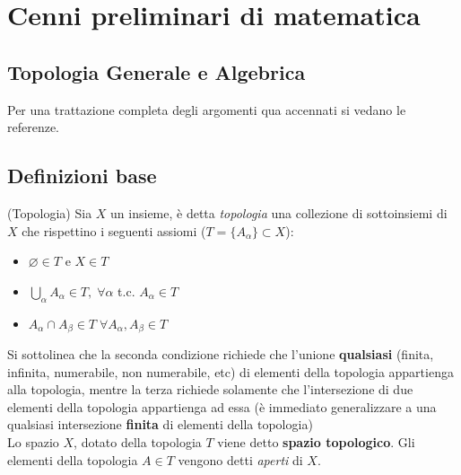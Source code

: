 \chapter{Cenni preliminari di matematica}
\section{Topologia Generale e Algebrica}
Per una trattazione completa degli argomenti qua accennati si vedano le referenze.

\section{Definizioni base}

\begin{definition}{(Topologia)}
  Sia $X$ un insieme, è detta \emph{topologia} una collezione di sottoinsiemi
  di $X$ che rispettino i seguenti assiomi ($T = \{A_\alpha\} \subset X$):
     \begin{itemize}
          \item $\varnothing \in T$ e $X \in T$
          \item $ \bigcup\limits_\alpha A_\alpha \in T, \;
             \forall \alpha $ t.c. $A_\alpha \in T$
          \item $ A_\alpha \cap A_\beta \in T \;
             \forall A_\alpha, A_\beta \in T$
     \end{itemize}
\end{definition}
Si sottolinea che la seconda condizione richiede che l'unione \textbf {qualsiasi}
(finita, infinita, numerabile, non numerabile, etc) di elementi della topologia
appartienga alla topologia, mentre la terza richiede solamente che l'intersezione
di due elementi della topologia appartienga ad essa (è immediato generalizzare
a una qualsiasi intersezione \textbf{finita} di elementi della topologia)\\

Lo spazio $X$, dotato della topologia $T$ viene detto \textbf{spazio topologico}.
Gli elementi della topologia $A \in T$ vengono detti \textit{aperti} di $X$.\\


